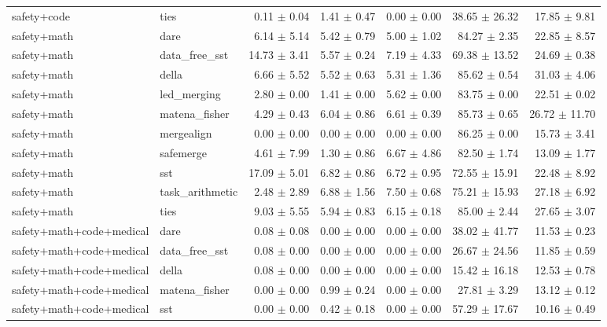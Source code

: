 \begin{table}[H]
{\begin{tabular}{llrrrrr}
safety+code & ties & 0.11 $\pm$ 0.04 & 1.41 $\pm$ 0.47 & 0.00 $\pm$ 0.00 & 38.65 $\pm$ 26.32 & 17.85 $\pm$ 9.81 \\
safety+math & dare & 6.14 $\pm$ 5.14 & 5.42 $\pm$ 0.79 & 5.00 $\pm$ 1.02 & 84.27 $\pm$ 2.35 & 22.85 $\pm$ 8.57 \\
safety+math & data\_free\_sst & 14.73 $\pm$ 3.41 & 5.57 $\pm$ 0.24 & 7.19 $\pm$ 4.33 & 69.38 $\pm$ 13.52 & 24.69 $\pm$ 0.38 \\
safety+math & della & 6.66 $\pm$ 5.52 & 5.52 $\pm$ 0.63 & 5.31 $\pm$ 1.36 & 85.62 $\pm$ 0.54 & 31.03 $\pm$ 4.06 \\
safety+math & led\_merging & 2.80 $\pm$ 0.00 & 1.41 $\pm$ 0.00 & 5.62 $\pm$ 0.00 & 83.75 $\pm$ 0.00 & 22.51 $\pm$ 0.02 \\
safety+math & matena\_fisher & 4.29 $\pm$ 0.43 & 6.04 $\pm$ 0.86 & 6.61 $\pm$ 0.39 & 85.73 $\pm$ 0.65 & 26.72 $\pm$ 11.70 \\
safety+math & mergealign & 0.00 $\pm$ 0.00 & 0.00 $\pm$ 0.00 & 0.00 $\pm$ 0.00 & 86.25 $\pm$ 0.00 & 15.73 $\pm$ 3.41 \\
safety+math & safemerge & 4.61 $\pm$ 7.99 & 1.30 $\pm$ 0.86 & 6.67 $\pm$ 4.86 & 82.50 $\pm$ 1.74 & 13.09 $\pm$ 1.77 \\
safety+math & sst & 17.09 $\pm$ 5.01 & 6.82 $\pm$ 0.86 & 6.72 $\pm$ 0.95 & 72.55 $\pm$ 15.91 & 22.48 $\pm$ 8.92 \\
safety+math & task\_arithmetic & 2.48 $\pm$ 2.89 & 6.88 $\pm$ 1.56 & 7.50 $\pm$ 0.68 & 75.21 $\pm$ 15.93 & 27.18 $\pm$ 6.92 \\
safety+math & ties & 9.03 $\pm$ 5.55 & 5.94 $\pm$ 0.83 & 6.15 $\pm$ 0.18 & 85.00 $\pm$ 2.44 & 27.65 $\pm$ 3.07 \\
safety+math+code+medical & dare & 0.08 $\pm$ 0.08 & 0.00 $\pm$ 0.00 & 0.00 $\pm$ 0.00 & 38.02 $\pm$ 41.77 & 11.53 $\pm$ 0.23 \\
safety+math+code+medical & data\_free\_sst & 0.08 $\pm$ 0.00 & 0.00 $\pm$ 0.00 & 0.00 $\pm$ 0.00 & 26.67 $\pm$ 24.56 & 11.85 $\pm$ 0.59 \\
safety+math+code+medical & della & 0.08 $\pm$ 0.00 & 0.00 $\pm$ 0.00 & 0.00 $\pm$ 0.00 & 15.42 $\pm$ 16.18 & 12.53 $\pm$ 0.78 \\
safety+math+code+medical & matena\_fisher & 0.00 $\pm$ 0.00 & 0.99 $\pm$ 0.24 & 0.00 $\pm$ 0.00 & 27.81 $\pm$ 3.29 & 13.12 $\pm$ 0.12 \\
safety+math+code+medical & sst & 0.00 $\pm$ 0.00 & 0.42 $\pm$ 0.18 & 0.00 $\pm$ 0.00 & 57.29 $\pm$ 17.67 & 10.16 $\pm$ 0.49 \\

\end{tabular}}
\end{table}
